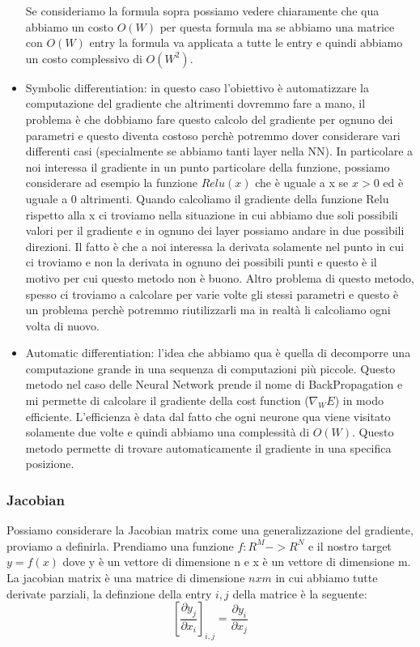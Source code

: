 \documentclass[14pt]{extreport}
\begin{document}
\begin{itemize}
\begin{figure}[H]
	      \end{figure}
	      Se consideriamo la formula sopra possiamo vedere chiaramente che qua abbiamo un costo $O(W)$ per questa formula ma se abbiamo una matrice
	      con $O(W)$ entry la formula va applicata a tutte le entry e quindi abbiamo un costo complessivo di $O(W^2)$.
	\item Symbolic differentiation: in questo caso l'obiettivo è automatizzare la computazione del gradiente che altrimenti dovremmo fare a mano, il
	      problema è che dobbiamo fare questo calcolo del gradiente per ognuno dei parametri e questo diventa costoso perchè potremmo dover
	      considerare vari differenti casi (specialmente se abbiamo tanti layer nella NN). In particolare a noi interessa il gradiente in un punto
	      particolare della funzione, possiamo considerare ad esempio la funzione $Relu(x)$ che è uguale a x se $x>0$ ed è uguale a 0 altrimenti.
	      Quando calcoliamo il gradiente della funzione Relu rispetto alla x ci troviamo nella situazione in cui abbiamo due soli possibili valori per
	      il gradiente e in ognuno dei layer possiamo andare in due possibili direzioni. Il fatto è che a noi interessa la derivata solamente nel
	      punto in cui ci troviamo e non la derivata in ognuno dei possibili punti e questo è il motivo per cui questo metodo non è buono. Altro
	      problema di questo metodo, spesso ci troviamo a calcolare per varie volte gli stessi parametri e questo è un problema perchè potremmo
	      riutilizzarli ma in realtà li calcoliamo ogni volta di nuovo.
	\item Automatic differentiation: l'idea che abbiamo qua è quella di decomporre una computazione grande in una sequenza di computazioni più
	      piccole. Questo metodo nel caso delle Neural Network prende il nome di BackPropagation e mi permette di calcolare il gradiente della cost
	      function ($\nabla_W E$) in modo efficiente. L'efficienza è data dal fatto che ogni neurone qua viene visitato solamente due volte e quindi
	      abbiamo una complessità di $O(W)$. Questo metodo permette di trovare automaticamente il gradiente in una specifica posizione.
\end{itemize}

\subsubsection{Jacobian}

Possiamo considerare la Jacobian matrix come una generalizzazione del gradiente, proviamo a definirla. Prendiamo una funzione $f: R^M -> R^N$ e il
nostro target $y = f(x)$ dove y è un vettore di dimensione n e x è un vettore di dimensione m. La jacobian matrix è una matrice di dimensione $nxm$ in
cui abbiamo tutte derivate parziali, la definzione della entry $i,j$ della matrice è la seguente:
$$[\frac{\partial y_j}{\partial x_i}]_{i,j} = \frac{\partial y_i}{\partial x_j}$$
\end{document}
